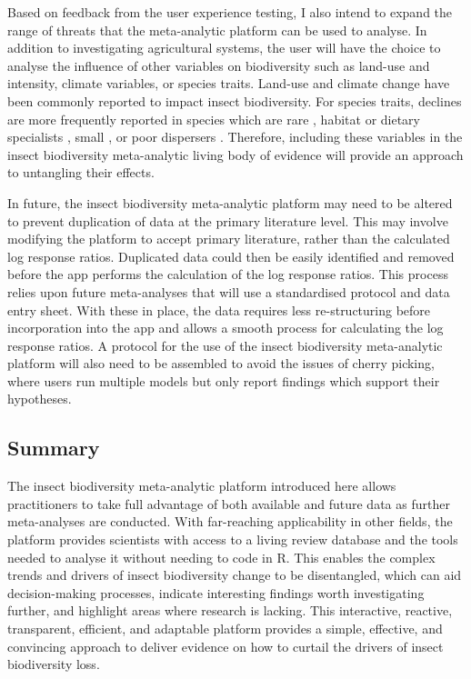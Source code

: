 \documentclass[11pt]{article}
\begin{document}
		\noindent Based on feedback from the user experience testing, I also intend to expand the range of threats that the meta-analytic platform can be used to analyse. In addition to investigating agricultural systems, the user will have the choice to analyse the influence of other variables on biodiversity such as land-use and intensity, climate variables, or species traits. Land-use \citep{newbold2016global,seibold2019arthropod,gillespie2022landscape} and climate change \citep{deutsch2008impacts,lister2018climate,engelhardt2022consistent} have been commonly reported to impact insect biodiversity. For species traits, declines are more frequently reported in species which are rare \citep{powney2019widespread,outhwaite2020complex}, habitat or dietary specialists \citep{biesmeijer2006parallel,boyes2019bucking,wagner2021window}, small \citep{homburg2019have}, or poor dispersers \citep{cardoso2020scientists}. Therefore, including these variables in the insect biodiversity meta-analytic living body of evidence will provide an approach to untangling their effects. 
		
		\noindent In future, the insect biodiversity meta-analytic platform may need to be altered to prevent duplication of data at the primary literature level. This may involve modifying the platform to accept primary literature, rather than the calculated log response ratios. Duplicated data could then be easily identified and removed before the app performs the calculation of the log response ratios. This process relies upon future meta-analyses that will use a standardised protocol and data entry sheet. With these in place, the data requires less re-structuring before incorporation into the app and allows a smooth process for calculating the log response ratios. A protocol for the use of the insect biodiversity meta-analytic platform will also need to be assembled to avoid the issues of cherry picking, where users run multiple models but only report findings which support their hypotheses. 
		
		\subsection{Summary}
		The insect biodiversity meta-analytic platform introduced here allows practitioners to take full advantage of both available and future data as further meta-analyses are conducted. With far-reaching applicability in other fields, the platform provides scientists with access to a living review database and the tools needed to analyse it without needing to code in R. This enables the complex trends and drivers of insect biodiversity change to be disentangled, which can aid decision-making processes, indicate interesting findings worth investigating further, and highlight areas where research is lacking. This interactive, reactive, transparent, efficient, and adaptable platform provides a simple, effective, and convincing approach to deliver evidence on how to curtail the drivers of insect biodiversity loss.  
		
\end{document}
